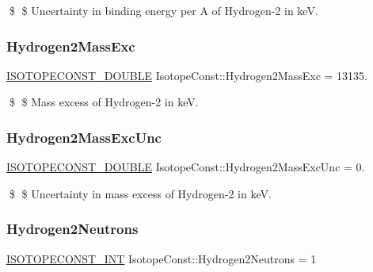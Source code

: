 \$ \$ Uncertainty in binding energy per A of Hydrogen-\/2 in keV. \mbox{\label{group___isotope_const-_hydrogen-_h2_ga06f13eba2046d07190ef73773f6e9559}} 
\subsubsection{\texorpdfstring{Hydrogen2\+Mass\+Exc}{Hydrogen2MassExc}}
{\footnotesize\ttfamily \mbox{\hyperlink{group___isotope_const-_macros_ga8f45a7272ce02c0b4c65c44636ed719a}{I\+S\+O\+T\+O\+P\+E\+C\+O\+N\+S\+T\+\_\+\+D\+O\+U\+B\+LE}} Isotope\+Const\+::\+Hydrogen2\+Mass\+Exc = 13135.}

\$ \$ Mass excess of Hydrogen-\/2 in keV. \mbox{\label{group___isotope_const-_hydrogen-_h2_ga4cc77326391c6c4ab0f47f506512e101}} 
\subsubsection{\texorpdfstring{Hydrogen2\+Mass\+Exc\+Unc}{Hydrogen2MassExcUnc}}
{\footnotesize\ttfamily \mbox{\hyperlink{group___isotope_const-_macros_ga8f45a7272ce02c0b4c65c44636ed719a}{I\+S\+O\+T\+O\+P\+E\+C\+O\+N\+S\+T\+\_\+\+D\+O\+U\+B\+LE}} Isotope\+Const\+::\+Hydrogen2\+Mass\+Exc\+Unc = 0.}

\$ \$ Uncertainty in mass excess of Hydrogen-\/2 in keV. \mbox{\label{group___isotope_const-_hydrogen-_h2_gad8dffa640a75151d00b895a38e876759}} 
\subsubsection{\texorpdfstring{Hydrogen2\+Neutrons}{Hydrogen2Neutrons}}
{\footnotesize\ttfamily \mbox{\hyperlink{group___isotope_const-_macros_ga5f18360b3e99483a35c32d789e62621c}{I\+S\+O\+T\+O\+P\+E\+C\+O\+N\+S\+T\+\_\+\+I\+NT}} Isotope\+Const\+::\+Hydrogen2\+Neutrons = 1}

